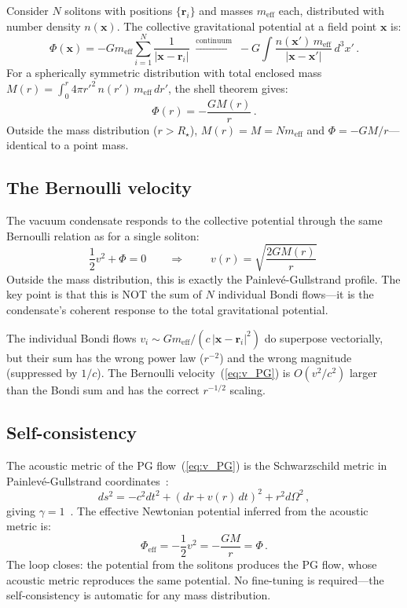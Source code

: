 \documentclass[12pt, a4paper]{article}
\newcommand{\meff}{m_{\mathrm{eff}}}
\begin{document}
Consider $N$ solitons with positions
$\{\mathbf{r}_i\}$ and masses $\meff$ each, distributed
with number density $n(\mathbf{x})$. The collective
gravitational potential at a field point $\mathbf{x}$
is:
\begin{equation}
    \Phi(\mathbf{x}) = -G\meff
    \sum_{i=1}^{N} \frac{1}{|\mathbf{x}-\mathbf{r}_i|}
    \;\xrightarrow{\text{continuum}}\;
    -G \int \frac{n(\mathbf{x}')\,\meff}
    {|\mathbf{x}-\mathbf{x}'|}\,d^3x'\,.
\label{eq:Phi_collective}
\end{equation}
For a spherically symmetric distribution with total
enclosed mass $M(r) = \int_0^r 4\pi r'^2\,
n(r')\,\meff\,dr'$, the shell theorem gives:
\begin{equation}
    \Phi(r) = -\frac{GM(r)}{r}\,.
\label{eq:Phi_shell}
\end{equation}
Outside the mass distribution ($r > R_\star$),
$M(r) = M = N\meff$ and
$\Phi = -GM/r$---identical to a point mass.

\subsection{The Bernoulli velocity}

The vacuum condensate responds to the collective
potential through the same Bernoulli relation as for a
single soliton:
\begin{equation}
    \frac{1}{2}v^2 + \Phi = 0
    \qquad\Longrightarrow\qquad
    \boxed{\;v(r) = \sqrt{\frac{2GM(r)}{r}}\;}
\label{eq:v_PG}
\end{equation}
Outside the mass distribution, this is exactly the
Painlev\'{e}-Gullstrand profile. The key point is
that this is NOT the sum of $N$ individual Bondi
flows---it is the condensate's coherent response to
the total gravitational potential.

The individual Bondi flows $v_i \sim G\meff/(c\,
|\mathbf{x}-\mathbf{r}_i|^2)$ do superpose vectorially,
but their sum has the wrong power law ($r^{-2}$) and
the wrong magnitude (suppressed by $1/c$). The
Bernoulli velocity~(\ref{eq:v_PG}) is $O(v^2/c^2)$
larger than the Bondi sum and has the correct $r^{-1/2}$
scaling.

\subsection{Self-consistency}

The acoustic metric of the PG flow~(\ref{eq:v_PG}) is
the Schwarzschild metric in Painlev\'{e}-Gullstrand
coordinates~\cite{visser_1998,volovik_2003}:
\begin{equation}
    ds^2 = -c^2 dt^2 + \left(dr + v(r)\,dt\right)^2
    + r^2 d\Omega^2\,,
\end{equation}
giving $\gamma = 1$~\cite{kulangiev_2026a}. The
effective Newtonian potential inferred from the
acoustic metric is:
\begin{equation}
    \Phi_{\mathrm{eff}} = -\frac{1}{2}v^2 = -\frac{GM}{r}
    = \Phi\,.
\label{eq:self_consistent}
\end{equation}
The loop closes: the potential from the solitons
produces the PG flow, whose acoustic metric reproduces
the same potential. No fine-tuning is required---the
self-consistency is automatic for any mass distribution.
\end{document}

